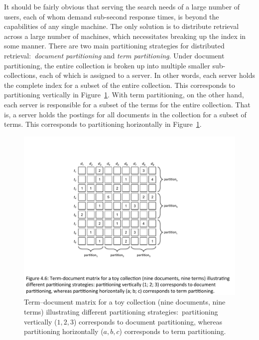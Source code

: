 It should be fairly obvious that serving the search needs of a large
number of users, each of whom demand sub-second response times, is
beyond the capabilities of any single machine.  The only solution is
to distribute retrieval across a large number of machines, which
necessitates breaking up the index in some manner.  There are two main
partitioning strategies for distributed retrieval:\ \emph{document
  partitioning} and \emph{term partitioning}.  Under document
partitioning, the entire collection is broken up into multiple smaller
sub-collections, each of which is assigned to a server.  In other
words, each server holds the complete index for a subset of the entire
collection.  This corresponds to partitioning vertically in
Figure~\ref{chapter-indexing:partition}.  With term partitioning, on
the other hand, each server is responsible for a subset of the terms
for the entire collection.  That is, a server holds the postings for
all documents in the collection for a subset of terms.  This
corresponds to partitioning horizontally in
Figure~\ref{chapter-indexing:partition}.

\begin{figure}[t]
\begin{center}
\includegraphics[scale=0.75]{figures/fig-ch4-indexing-partition.pdf}
\end{center}
\caption{Term--document matrix for a toy collection (nine documents,
  nine terms) illustrating different partitioning
  strategies:\ partitioning vertically ($1,2,3$) corresponds to
  document partitioning, whereas partitioning horizontally ($a,b,c$)
  corresponds to term partitioning.}
\label{chapter-indexing:partition}
\end{figure}

